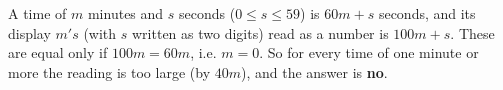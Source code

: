 A time of $m$ minutes and $s$ seconds ($0\le s\le59$) is $60m+s$ seconds, and its display $m's$ (with $s$ written as two digits) read as a number is $100m+s$. These are equal only if $100m=60m$, i.e. $m=0$. So for every time of one minute or more the reading is too large (by $40m$), and the answer is \textbf{no}.
